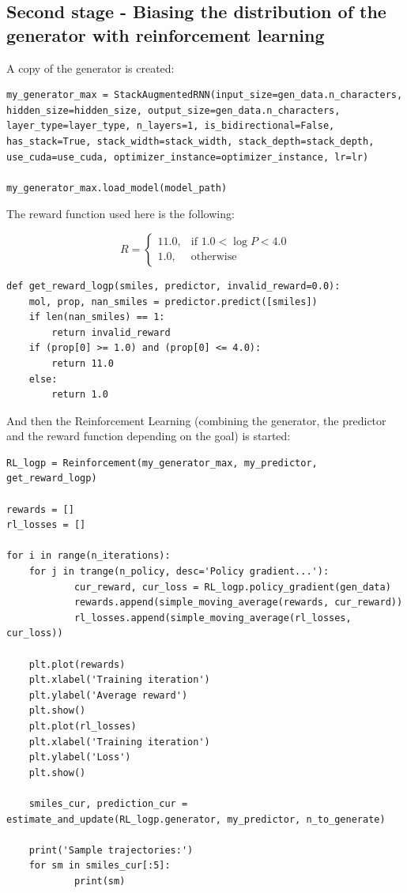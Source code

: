 \documentclass[a4paper]{article}
\begin{document}
\subsection{Second stage - Biasing the distribution of the generator with reinforcement learning}\label{sec:Second stage - Biasing the distribution of the generator with reinforcement learning}

A copy of the generator is created:

\begin{lstlisting}
my_generator_max = StackAugmentedRNN(input_size=gen_data.n_characters, hidden_size=hidden_size, output_size=gen_data.n_characters, layer_type=layer_type, n_layers=1, is_bidirectional=False, has_stack=True, stack_width=stack_width, stack_depth=stack_depth, use_cuda=use_cuda, optimizer_instance=optimizer_instance, lr=lr)

my_generator_max.load_model(model_path)
\end{lstlisting}

The reward function used here is the following:

$$
R =  \begin{cases} 11.0, & \mbox{if } 1.0 < \log P < 4.0 \\ 1.0, & \mbox{otherwise}  \end{cases}
$$

\begin{lstlisting}
def get_reward_logp(smiles, predictor, invalid_reward=0.0):
    mol, prop, nan_smiles = predictor.predict([smiles])
    if len(nan_smiles) == 1:
        return invalid_reward
    if (prop[0] >= 1.0) and (prop[0] <= 4.0):
        return 11.0
    else:
        return 1.0
\end{lstlisting}

And then the Reinforcement Learning (combining the generator, the predictor and the reward function depending on the goal) is started:

\begin{lstlisting}
RL_logp = Reinforcement(my_generator_max, my_predictor, get_reward_logp)

rewards = []
rl_losses = []

for i in range(n_iterations):
	for j in trange(n_policy, desc='Policy gradient...'):
			cur_reward, cur_loss = RL_logp.policy_gradient(gen_data)
			rewards.append(simple_moving_average(rewards, cur_reward)) 
			rl_losses.append(simple_moving_average(rl_losses, cur_loss))
	
	plt.plot(rewards)
	plt.xlabel('Training iteration')
	plt.ylabel('Average reward')
	plt.show()
	plt.plot(rl_losses)
	plt.xlabel('Training iteration')
	plt.ylabel('Loss')
	plt.show()
			
	smiles_cur, prediction_cur = estimate_and_update(RL_logp.generator, my_predictor, n_to_generate)
																									
	print('Sample trajectories:')
	for sm in smiles_cur[:5]:
			print(sm)
\end{lstlisting}
\end{document}
